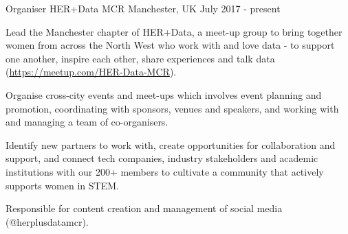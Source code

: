 \begin{cventries}
{\begin{cvitems}
      \end{cvitems}
    }    
\cventry
    {Organiser}
    {HER+Data MCR}
    {Manchester, UK}
    {July 2017 - present}
    {
      \begin{cvitems}
        \item {Lead the Manchester chapter of HER+Data, a meet-up group to bring together women from across the North West who work with and love data - to support one another, inspire each other, share experiences and talk data (\url{https://meetup.com/HER-Data-MCR}).}
        \item {Organise cross-city events and meet-ups which involves event planning and promotion, coordinating with sponsors, venues and speakers, and working with and managing a team of co-organisers.}
        \item {Identify new partners to work with, create opportunities for collaboration and support, and connect tech companies, industry stakeholders and academic institutions with our 200+ members to cultivate a community that actively supports women in STEM.}
        \item {Responsible for content creation and management of social media (@herplusdatamcr).}
      \end{cvitems}
    }
\end{cventries}
